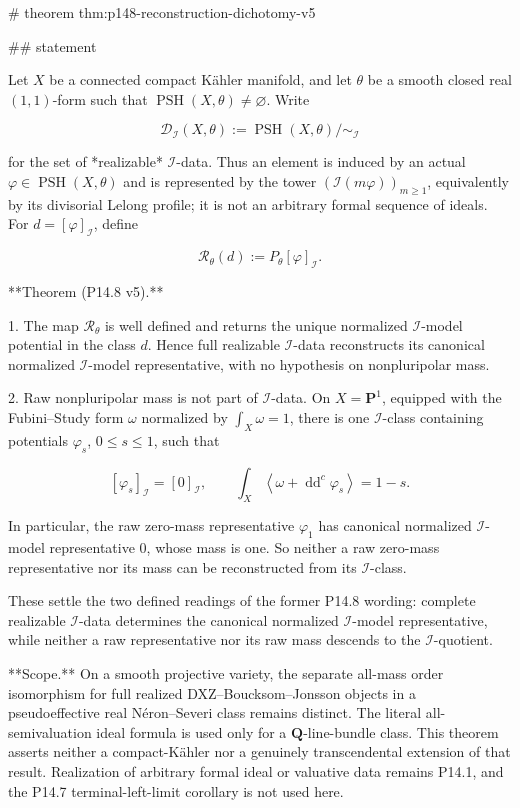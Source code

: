 # theorem thm:p148-reconstruction-dichotomy-v5

## statement

Let $X$ be a connected compact Kähler manifold, and let $\theta$ be a smooth
closed real $(1,1)$-form such that $\operatorname{PSH}(X,\theta)\ne\varnothing$.
Write

$$
\mathscr D_{\mathcal I}(X,\theta)
:=\operatorname{PSH}(X,\theta)/{\sim_{\mathcal I}}
$$

for the set of *realizable* $\mathcal I$-data. Thus an element is induced by
an actual $\varphi\in\operatorname{PSH}(X,\theta)$ and is represented by the
tower $(\mathcal I(m\varphi))_{m\ge1}$, equivalently by its divisorial Lelong
profile; it is not an arbitrary formal sequence of ideals. For
$d=[\varphi]_{\mathcal I}$, define

$$
\mathcal R_\theta(d):=P_\theta[\varphi]_{\mathcal I}.
$$

**Theorem (P14.8 v5).**

1. The map $\mathcal R_\theta$ is well defined and returns the unique
   normalized $\mathcal I$-model potential in the class $d$. Hence full
   realizable $\mathcal I$-data reconstructs its canonical normalized
   $\mathcal I$-model representative, with no hypothesis on nonpluripolar
   mass.

2. Raw nonpluripolar mass is not part of $\mathcal I$-data. On
   $X=\mathbf P^1$, equipped with the Fubini--Study form $\omega$ normalized
   by $\int_X\omega=1$, there is one $\mathcal I$-class containing potentials
   $\varphi_s$, $0\le s\le1$, such that

   $$
   [\varphi_s]_{\mathcal I}=[0]_{\mathcal I},\qquad
   \int_X\left\langle\omega+\operatorname{dd}^c\varphi_s\right\rangle=1-s.
   $$

   In particular, the raw zero-mass representative $\varphi_1$ has canonical
   normalized $\mathcal I$-model representative $0$, whose mass is one. So
   neither a raw zero-mass representative nor its mass can be reconstructed
   from its $\mathcal I$-class.

These settle the two defined readings of the former P14.8 wording: complete
realizable $\mathcal I$-data determines the canonical normalized
$\mathcal I$-model representative, while neither a raw representative nor
its raw mass descends to the $\mathcal I$-quotient.

**Scope.** On a smooth projective variety, the separate all-mass order
isomorphism for full realized DXZ--Boucksom--Jonsson objects in a
pseudoeffective real Néron--Severi class remains distinct. The literal
all-semivaluation ideal formula is used only for a $\mathbf Q$-line-bundle
class. This theorem asserts neither a compact-Kähler nor a genuinely
transcendental extension of that result. Realization of arbitrary formal
ideal or valuative data remains P14.1, and the P14.7 terminal-left-limit
corollary is not used here.

